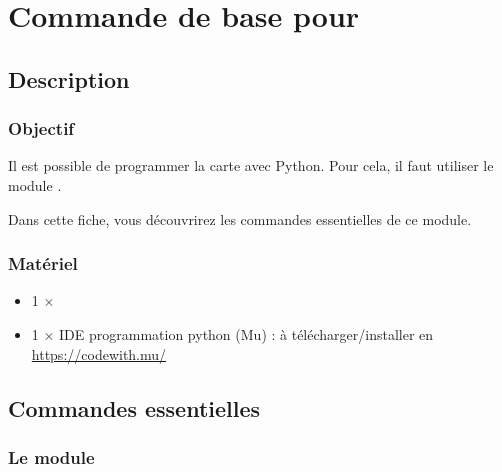 \section{Commande de base pour \mbpy}


\pagestyle{mbpy}

\subsection{Description}

\subsubsection{Objectif}

\begin{formule}
Il est possible de programmer la carte \mb avec Python. Pour cela, il faut utiliser le module \mb.

Dans cette fiche, vous découvrirez les commandes essentielles de ce module.
\end{formule}


\subsubsection{Matériel}
\begin{itemize}
    \item 1 $\times$ \matosMb
    \item 1 $\times$ IDE programmation python (Mu) : à télécharger/installer en \href{cliquant ici}{https://codewith.mu/}
\end{itemize}




\subsection{Commandes essentielles}

%
%


\subsubsection{Le module }

